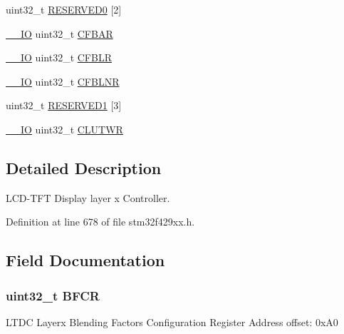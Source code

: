 \begin{DoxyCompactItemize}
\item 
uint32\+\_\+t \hyperlink{struct_l_t_d_c___layer___type_def_af2c92c7cb13569aaff6b4f5a25de5056}{R\+E\+S\+E\+R\+V\+E\+D0} \mbox{[}2\mbox{]}
\item 
\hyperlink{core__sc300_8h_aec43007d9998a0a0e01faede4133d6be}{\+\_\+\+\_\+\+IO} uint32\+\_\+t \hyperlink{struct_l_t_d_c___layer___type_def_a11b37b8303d2ddad1ee962c362cad796}{C\+F\+B\+AR}
\item 
\hyperlink{core__sc300_8h_aec43007d9998a0a0e01faede4133d6be}{\+\_\+\+\_\+\+IO} uint32\+\_\+t \hyperlink{struct_l_t_d_c___layer___type_def_a1c2a59fc9bb4101881c7ddc98b938a4f}{C\+F\+B\+LR}
\item 
\hyperlink{core__sc300_8h_aec43007d9998a0a0e01faede4133d6be}{\+\_\+\+\_\+\+IO} uint32\+\_\+t \hyperlink{struct_l_t_d_c___layer___type_def_ad94a5782e5cc67b071738f8096bb4855}{C\+F\+B\+L\+NR}
\item 
uint32\+\_\+t \hyperlink{struct_l_t_d_c___layer___type_def_a277c51159a2abc260e512496aec82828}{R\+E\+S\+E\+R\+V\+E\+D1} \mbox{[}3\mbox{]}
\item 
\hyperlink{core__sc300_8h_aec43007d9998a0a0e01faede4133d6be}{\+\_\+\+\_\+\+IO} uint32\+\_\+t \hyperlink{struct_l_t_d_c___layer___type_def_a5ab25158531531e9b1cdb2bdbe66b67d}{C\+L\+U\+T\+WR}
\end{DoxyCompactItemize}


\subsection{Detailed Description}
L\+C\+D-\/\+T\+FT Display layer x Controller. 

Definition at line 678 of file stm32f429xx.\+h.



\subsection{Field Documentation}
\subsubsection[{\texorpdfstring{B\+F\+CR}{BFCR}}]{ uint32\+\_\+t B\+F\+CR}\hypertarget{struct_l_t_d_c___layer___type_def_a8a598358c93b94fe534a4ed8aeb05220}{}\label{struct_l_t_d_c___layer___type_def_a8a598358c93b94fe534a4ed8aeb05220}
L\+T\+DC Layerx Blending Factors Configuration Register Address offset\+: 0x\+A0 

